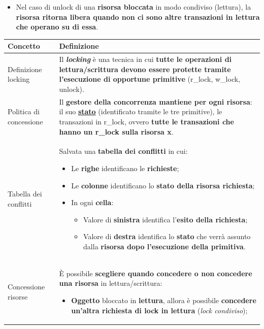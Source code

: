 \documentclass[a4paper]{article}
\begin{document}
\begin{enumerate}
\begin{itemize}
			\item Nel caso di \textsf{unlock} di una \textbf{risorsa bloccata} in modo condiviso (lettura), la \textbf{risorsa ritorna libera quando non ci sono altre transazioni in lettura che operano su di essa}.
		\end{itemize}\newpage
		
		\begin{table}[!htp]
			\centering
			\begin{tabular}{@{} l p{21em} @{}}
				\toprule
				Concetto & Definizione \\
				\midrule
				Definizione locking & Il \emph{\textbf{locking}} è una tecnica in cui \textbf{tutte le operazioni di lettura/scrittura devono essere protette tramite l'esecuzione di opportune primitive} (\textsf{r\_lock}, \textsf{w\_lock}, \textsf{unlock}). \\ [.7em]
				Politica di concessione & Il \textbf{gestore della concorrenza mantiene per ogni risorsa}: il suo \underline{\textbf{stato}} (identificato tramite le tre primitive), le transazioni in \textsf{r\_lock}, ovvero \textbf{tutte le transazioni che hanno un \textsf{r\_lock} sulla risorsa x}. \\ [.7em]
				Tabella dei conflitti & Salvata una \textbf{tabella dei conflitti} in cui:
				\begin{itemize}
					\item Le \textbf{righe} identificano le \textbf{richieste};
					
					\item Le \textbf{colonne} identificano lo \textbf{stato della risorsa richiesta};
					
					\item In ogni \textbf{cella}:
					\begin{itemize}
						\item Valore di \textbf{sinistra} identifica l'\textbf{esito della richiesta};
						
						\item Valore di \textbf{destra} identifica lo \textbf{stato} che verrà assunto dalla \textbf{risorsa dopo l'esecuzione della primitiva}.
					\end{itemize}
				\end{itemize} \\ [.7em]
				Concessione risorse & È possibile \textbf{scegliere quando concedere o non concedere una risorsa} in lettura/scrittura:
				\begin{itemize}
					\item \textbf{Oggetto} bloccato in \textbf{lettura}, allora è possibile \textbf{concedere un'altra richiesta di lock in lettura} (\emph{lock condiviso});
					

\end{itemize}
\end{tabular}
\end{table}
\end{enumerate}
\end{document}
